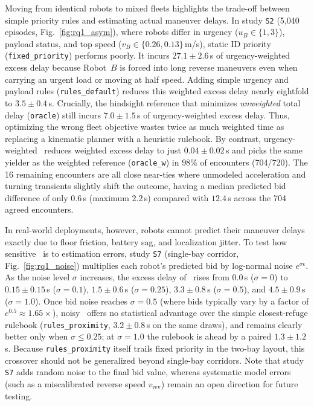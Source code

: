 Moving from identical robots to mixed fleets highlights the trade-off between simple priority rules and estimating actual maneuver delays. In study \texttt{S2} (5,040 episodes, Fig.~\ref{fig:rq1_asym}), where robots differ in urgency ($u_B\in\{1,3\}$), payload status, and top speed ($v_B\in\{0.26,0.13\}$\,m/s), static ID priority (\texttt{fixed\_priority}) performs poorly. It incurs $27.1\pm 2.6$\,s of urgency-weighted excess delay because Robot~$B$ is forced into long reverse maneuvers even when carrying an urgent load or moving at half speed. Adding simple urgency and payload rules (\texttt{rules\_default}) reduces this weighted excess delay nearly eightfold to $3.5\pm 0.4$\,s. Crucially, the hindsight reference that minimizes \emph{unweighted} total delay (\texttt{oracle}) still incurs $7.0\pm 1.5$\,s of urgency-weighted excess delay. Thus, optimizing the wrong fleet objective wastes twice as much weighted time as replacing a kinematic planner with a heuristic rulebook. By contrast, urgency-weighted \cb\ reduces weighted excess delay to just $0.04\pm 0.02$\,s and picks the same yielder as the weighted reference (\texttt{oracle\_w}) in $98\%$ of encounters (704/720). The 16 remaining encounters are all close near-ties where unmodeled acceleration and turning transients slightly shift the outcome, having a median predicted bid difference of only $0.6$\,s (maximum $2.2$\,s) compared with $12.4$\,s across the 704 agreed encounters.

In real-world deployments, however, robots cannot predict their maneuver delays exactly due to floor friction, battery sag, and localization jitter. To test how sensitive \cb\ is to estimation errors, study \texttt{S7} (single-bay corridor, Fig.~\ref{fig:rq1_noise}) multiplies each robot's predicted bid by log-normal noise $e^{\sigma\epsilon}$. As the noise level $\sigma$ increases, the excess delay of \cb\ rises from $0.0$\,s ($\sigma=0$) to $0.15\pm 0.15$\,s ($\sigma=0.1$), $1.5\pm 0.6$\,s ($\sigma=0.25$), $3.3\pm 0.8$\,s ($\sigma=0.5$), and $4.5\pm 0.9$\,s ($\sigma=1.0$). Once bid noise reaches $\sigma=0.5$ (where bids typically vary by a factor of $e^{0.5}\approx 1.65\times$), noisy \cb\ offers no statistical advantage over the simple closest-refuge rulebook (\texttt{rules\_proximity}, $3.2\pm 0.8$\,s on the same draws), and remains clearly better only when $\sigma\le 0.25$; at $\sigma=1.0$ the rulebook is ahead by a paired $1.3\pm 1.2$\,s. Because \texttt{rules\_proximity} itself trails fixed priority in the two-bay layout, this crossover should not be generalized beyond single-bay corridors. Note that study \texttt{S7} adds random noise to the final bid value, whereas systematic model errors (such as a miscalibrated reverse speed $v_{\mathrm{rev}}$) remain an open direction for future testing.

